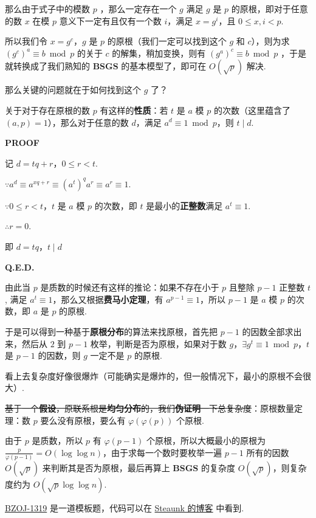 那么由于式子中的模数 $p$ ，那么一定存在一个 $g$ 满足 $g$ 是 $p$ 的原根，即对于任意的数 $x$ 在模 $p$ 意义下一定有且仅有一个数 $i$，满足 $x = g^i$，且 $0 \le x,i < p$.

所以我们令 $x=g^c$，$g$ 是 $p$ 的原根（我们一定可以找到这个 $g$ 和 $c$），则为求 $(g^c)^a \equiv b \bmod p$ 的关于 $c$ 的解集，稍加变换，则有 $(g^a)^c \equiv b \bmod p$ ，于是就转换成了我们熟知的 \textbf{BSGS} 的基本模型了，即可在 $O(\sqrt p)$ 解决.

那么关键的问题就在于如何找到这个 $g$ 了？

关于对于存在原根的数 $p$ 有这样的\textbf{性质}：若 $t$ 是 $a$ 模 $p$ 的次数（这里蕴含了 $(a,p)=1$），那么对于任意的数 $d$，满足 $a^d \equiv 1 \bmod p$，则 $t \mid d$.

\textbf{PROOF}

记 $d = tq+r$，$0 \le r < t$.

$\because a^d \equiv a^{xq+r} \equiv (a^t)^qa^r \equiv a^r \equiv 1$.

$\because 0 \le r < t$，$t$ 是 $a$ 模 $p$ 的次数，即 $t$ 是最小的\textbf{正整数}满足 $a^t \equiv 1$.

$\therefore r = 0$.

即 $d = tq$，$t \mid d$

\textbf{Q.E.D.}

由此当 $p$ 是质数的时候还有这样的推论：如果不存在小于 $p$ 且整除 $p-1$ 正整数 $t$, 满足 $a^t \equiv 1$，那么又根据\textbf{费马小定理}，有 $a^{p-1} \equiv 1$，所以 $p-1$ 是 $a$ 模 $p$ 的次数，即 $a$ 是 $p$ 的原根.

于是可以得到一种基于\textbf{原根分布}的算法来找原根，首先把 $p-1$ 的因数全部求出来，然后从 $2$ 到 $p-1$ 枚举，判断是否为原根，如果对于数 $g$，$\exists g^t \equiv 1 \bmod p$，$t$ 是 $p-1$ 的因数，则 $g$ 一定不是 $p$ 的原根.

看上去复杂度好像很爆炸（可能确实是爆炸的，但一般情况下，最小的原根不会很大）.

\sout{基于一个\textbf{假设}，原联系根是\textbf{均匀分布}的，我们\textbf{伪证明}一下总复杂度}：原根数量定理：数 $p$ 要么没有原根，要么有 $\varphi(\varphi(p))$ 个原根.

由于 $p$ 是质数，所以 $p$ 有 $\varphi(p-1)$ 个原根，所以大概最小的原根为 $\frac{p}{\varphi(p-1)}=O(\log\log n)$，由于求每一个数时要枚举一遍 $p-1$ 所有的因数 $O(\sqrt p)$ 来判断其是否为原根，最后再算上 \textbf{BSGS} 的复杂度 $O(\sqrt{p})$，则复杂度约为 $O(\sqrt{p}\log \log n)$.

\href{http://www.lydsy.com/JudgeOnline/problem.php?id=1319}{BZOJ-1319} 是一道模板题，代码可以在 \href{https://blog.csdn.net/Steaunk/article/details/78988376}{Steaunk 的博客} 中看到.

